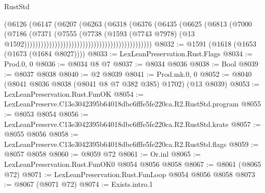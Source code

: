 \begin{lexlean}{RustStd}
\begin{coremodule}
                                                                (@6126
                                                                  (@6147
                                                                    (@6207
                                                                      (@6263
                                                                        (@6318
                                                                          (@6376
                                                                            (@6435
                                                                              (@6625
                                                                                (@6813
                                                                                  (@7000
                                                                                    (@7186
                                                                                      (@7371
                                                                                        (@7555
                                                                                          (@7738
                                                                                            (@1593
                                                                                              (@7743
                                                                                                @7978)
                                                                                              (@13
                                                                                                @1592))))))))))))))))))))))))))))))))))))))))))))))
@8032 := @1591 (@1618 (@1653 (@1673 (@1684 @8027))))
@8033 := LexLeanPreservation.Rust.Flags
@8034 := Prod.{0, 0}
@8036 := @8034 @8 @7
@8037 := @8034 @8036
@8038 := Bool
@8039 := @8037 @8038
@8040 := @2 @8039
@8041 := Prod.mk.{0, 0}
@8052 := @8040 (@8041 @8036 @8038 (@8041 @8 @7 @382 @385) @1702) (@13 @8039)
@8053 := LexLeanPreservation.Rust.FunOK
@8054 := LexLeanPreserve.C13e3042395b64018dbc6fffe5fe220ca.R2.RustStd.program
@8055 := @8053 @8054
@8056 := LexLeanPreserve.C13e3042395b64018dbc6fffe5fe220ca.R2.RustStd.krate
@8057 := @8055 @8056
@8058 := LexLeanPreserve.C13e3042395b64018dbc6fffe5fe220ca.R2.RustStd.flags
@8059 := @8057 @8058
@8060 := @8059 @72
@8061 := Or.inl
@8065 := LexLeanPreservation.Rust.FunOK0 @8054 @8056 @8058
@8067 := @8061 (@8065 @72)
@8071 := LexLeanPreservation.Rust.FunLoop @8054 @8056 @8058
@8073 := @8067 (@8071 @72)
@8074 := Exists.intro.{1}

\end{coremodule}
\end{lexlean}
